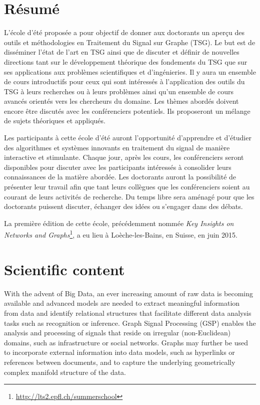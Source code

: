 \documentclass[a4paper]{scrartcl}
\begin{document}
\section{Résumé}

L'école d'été proposée a pour objectif de donner aux doctorants un aperçu des
outils et méthodologies en Traitement du Signal sur Graphe (TSG). Le but est de
disséminer l'état de l'art en TSG ainsi que de discuter et définir de nouvelles
directions tant sur le développement théorique des fondements du TSG que sur ses
applications aux problèmes scientifiques et d'ingénieries. Il y aura un ensemble
de cours introductifs pour ceux qui sont intéressés à l'application des outils
du TSG à leurs recherches ou à leurs problèmes ainsi qu'un ensemble de cours
avancés orientés vers les chercheurs du domaine. Les thèmes abordés doivent
encore être discutés avec les conférenciers potentiels. Ils proposeront un
mélange de sujets théoriques et appliqués.

Les participants à cette école d'été auront l'opportunité d'apprendre et
d'étudier des algorithmes et systèmes innovants en traitement du signal de
manière interactive et stimulante. Chaque jour, après les cours, les
conférenciers seront disponibles pour discuter avec les participants intéressés
à consolider leurs connaissances de la matière abordée. Les doctorants auront la
possibilité de présenter leur travail afin que tant leurs collègues que les
conférenciers soient au courant de leurs activités de recherche. Du temps libre
sera aménagé pour que les doctorants puissent discuter, échanger des idées ou
s'engager dans des débats.

La première édition de cette école, précédemment nommée \textit{Key Insights on
Networks and Graphs}\footnote{\url{http://lts2.epfl.ch/summerschool}}, a eu lieu
à Loèche-les-Bains, en Suisse, en juin 2015.

\section{Scientific content}

With the advent of Big Data, an ever increasing amount of raw data is becoming
available and advanced models are needed to extract meaningful information from
data and identify relational structures that facilitate different data analysis
tasks such as recognition or inference. Graph Signal Processing (GSP) enables
the analysis and processing of signals that reside on irregular (non-Euclidean)
domains, such as infrastructure or social networks. Graphs may further be used
to incorporate external information into data models, such as hyperlinks or
references between documents, and to capture the underlying geometrically
complex manifold structure of the data.
\end{document}
